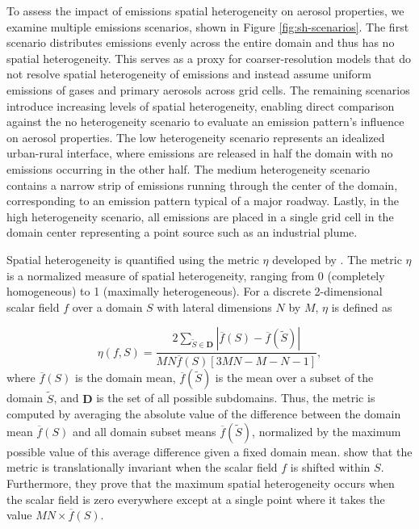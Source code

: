 \documentclass[acp, manuscript]{copernicus}
\begin{document}
To assess the impact of emissions spatial heterogeneity on aerosol
properties, we examine multiple emissions scenarios, shown in Figure
\ref{fig:sh-scenarios}. The first scenario distributes emissions evenly 
across the entire domain and thus has no spatial heterogeneity. This
serves as a proxy for coarser-resolution models that do not resolve
spatial heterogeneity of emissions and instead assume uniform
emissions of gases and primary aerosols across grid cells. The
remaining scenarios introduce increasing levels of spatial
heterogeneity, enabling direct comparison against the no heterogeneity scenario to evaluate 
an emission pattern's influence on aerosol properties. The low
heterogeneity scenario represents an idealized urban-rural interface, where emissions are
released in half the domain with no emissions occurring in the other
half. The medium heterogeneity scenario contains a narrow strip of emissions running through
the center of the domain, corresponding to an emission pattern typical
of a major roadway. Lastly, in the high heterogeneity scenario, all emissions 
are placed in a single grid cell in the domain center representing a point source such
as an industrial plume.

Spatial heterogeneity is quantified using the metric $\eta$ developed by
\citep{mohebalhojeh_metric_2026}. The metric $\eta$ is a normalized
measure of spatial heterogeneity, ranging from 0 (completely
homogeneous) to 1 (maximally heterogeneous). For a discrete
2-dimensional scalar field $f$ over a domain $S$ with lateral
dimensions $N$ by $M$, $\eta$ is defined as

\begin{equation}
\eta(f, S) = \frac{2\sum_{\tilde{S}\in \mathbf{D}}|\overline{f}(S) - \overline{f}(\tilde{S})|}{MN\overline{f}(S)\left[3MN-M-N-1\right]}, 
\end{equation}
where $\overline{f}(S)$ is the domain mean, $\overline{f}(\tilde{S})$ is the mean over a subset of the domain
$\tilde{S}$, and $\mathbf{D}$ is the set of all possible subdomains. Thus, the metric is computed by averaging the absolute
value of the difference between the domain mean $\overline{f}(S)$ and
all domain subset means $\overline{f}(\tilde{S})$, normalized by the
maximum possible value of this average difference given a fixed domain mean. \citet{mohebalhojeh_metric_2026} show that the metric is
translationally invariant when the scalar field $f$ is shifted within
$S$. Furthermore, they prove that the
maximum spatial heterogeneity occurs when the
scalar field is zero everywhere except at a single point
where it takes the value $MN\times\overline{f}(S)$.
\end{document}
